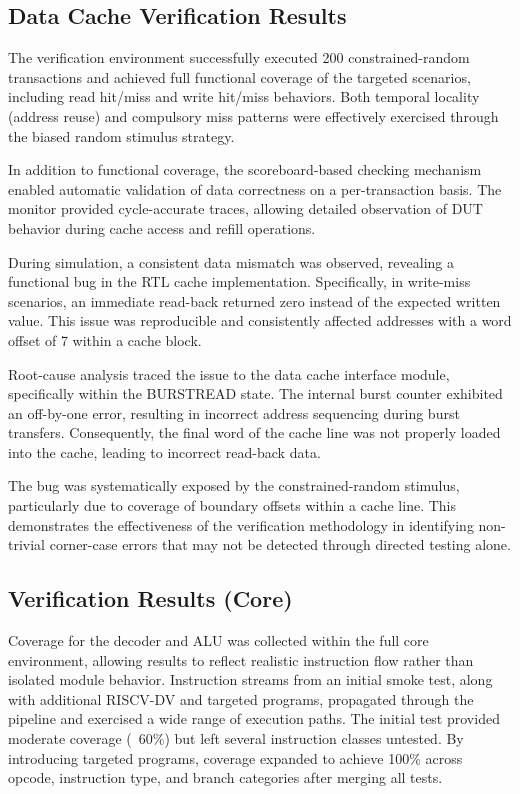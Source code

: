 \documentclass[conference]{IEEEtran}
\begin{document}
    \subsection{Data Cache Verification Results}
        The verification environment successfully executed 200 constrained-random transactions and achieved full functional coverage of the targeted scenarios, including read hit/miss and write hit/miss behaviors. Both temporal locality (address reuse) and compulsory miss patterns were effectively exercised through the biased random stimulus strategy.
        
        In addition to functional coverage, the scoreboard-based checking mechanism enabled automatic validation of data correctness on a per-transaction basis. The monitor provided cycle-accurate traces, allowing detailed observation of DUT behavior during cache access and refill operations.
        
        During simulation, a consistent data mismatch was observed, revealing a functional bug in the RTL cache implementation. Specifically, in write-miss scenarios, an immediate read-back returned zero instead of the expected written value. This issue was reproducible and consistently affected addresses with a word offset of 7 within a cache block.
        
        Root-cause analysis traced the issue to the data cache interface module, specifically within the BURSTREAD state. The internal burst counter exhibited an off-by-one error, resulting in incorrect address sequencing during burst transfers. Consequently, the final word of the cache line was not properly loaded into the cache, leading to incorrect read-back data.
        
        The bug was systematically exposed by the constrained-random stimulus, particularly due to coverage of boundary offsets within a cache line. This demonstrates the effectiveness of the verification methodology in identifying non-trivial corner-case errors that may not be detected through directed testing alone.
    \subsection{Verification Results (Core)}
        Coverage for the decoder and ALU was collected within the full core environment, allowing results to reflect realistic instruction flow rather than isolated module behavior. Instruction streams from an initial smoke test, along with additional RISCV-DV and targeted programs, propagated through the pipeline and exercised a wide range of execution paths. The initial test provided moderate coverage (~60\%) but left several instruction classes untested. By introducing targeted programs, coverage expanded to achieve 100\% across opcode, instruction type, and branch categories after merging all tests.
        
\end{document}
